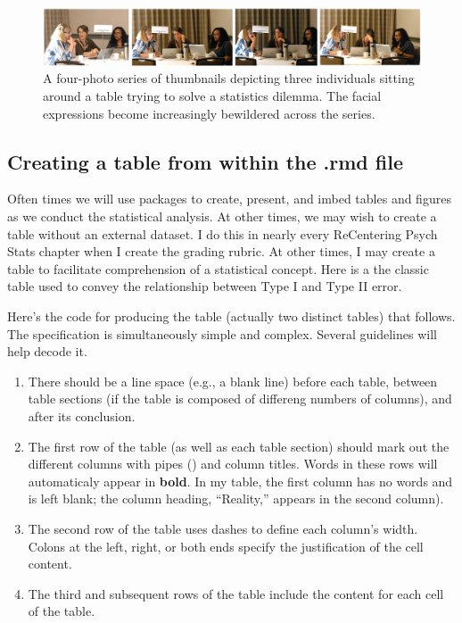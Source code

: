 \documentclass[
]{book}
\providecommand{\tightlist}{%
  \setlength{\itemsep}{0pt}\setlength{\parskip}{0pt}}
\begin{document}
\begin{figure}
\centering
\includegraphics{images/formatting/StatsConsult.png}
\caption{A four-photo series of thumbnails depicting three individuals sitting around a table trying to solve a statistics dilemma. The facial expressions become increasingly bewildered across the series.}
\end{figure}

\hypertarget{creating-a-table-from-within-the-.rmd-file}{%
\subsection{Creating a table from within the .rmd file}\label{creating-a-table-from-within-the-.rmd-file}}

Often times we will use packages to create, present, and imbed tables and figures as we conduct the statistical analysis. At other times, we may wish to create a table without an external dataset. I do this in nearly every ReCentering Psych Stats chapter when I create the grading rubric. At other times, I may create a table to facilitate comprehension of a statistical concept. Here is a the classic table used to convey the relationship between Type I and Type II error.

Here's the code for producing the table (actually two distinct tables) that follows. The specification is simultaneously simple and complex. Several guidelines will help decode it.

\begin{enumerate}
\def\labelenumi{\arabic{enumi}.}
\tightlist
\item
  There should be a line space (e.g., a blank line) before each table, between table sections (if the table is composed of differeng numbers of columns), and after its conclusion.
\item
  The first row of the table (as well as each table section) should mark out the different columns with pipes (\texttt{\textbar{}}) and column titles. Words in these rows will automaticaly appear in \textbf{bold}. In my table, the first column has no words and is left blank; the column heading, ``Reality,'' appears in the second column).
\item
  The second row of the table uses dashes to define each column's width. Colons at the left, right, or both ends specify the justification of the cell content.
\item
  The third and subsequent rows of the table include the content for each cell of the table.
\end{enumerate}
\end{document}
